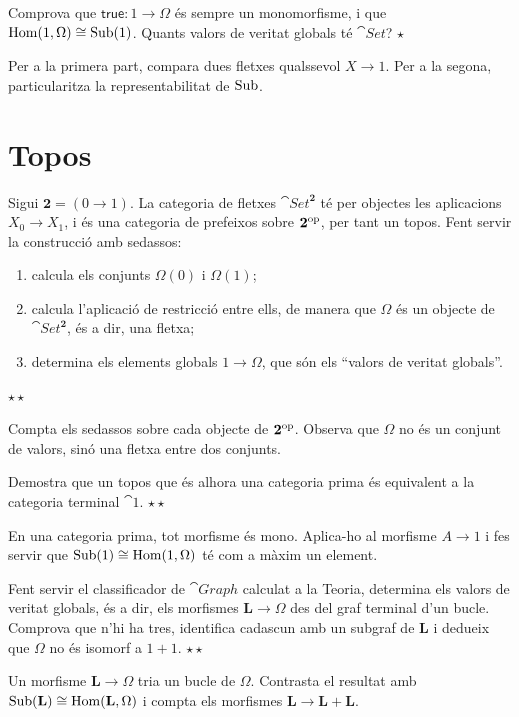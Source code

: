 \begin{exercici}
Comprova que $\mathsf{true}\colon1\to\Omega$ és sempre un monomorfisme, i que $\operatorname{Hom}(1,\Omega)\cong\operatorname{Sub}(1)$. Quants valors de veritat globals té $\cat{Set}$? \hfill{\normalfont$\star$}
\begin{indicacio}
Per a la primera part, compara dues fletxes qualssevol $X\to1$. Per a la segona, particularitza la representabilitat de $\operatorname{Sub}$.
\end{indicacio}
\end{exercici}

\section{Topos}

\begin{exercici}
Sigui $\mathbf 2=(0\to 1)$. La categoria de fletxes $\cat{Set}^{\mathbf 2}$ té per objectes les aplicacions $X_0\to X_1$, i és una categoria de prefeixos sobre $\mathbf 2^{\mathrm{op}}$, per tant un topos. Fent servir la construcció amb sedassos:
\begin{enumerate}
  \item calcula els conjunts $\Omega(0)$ i $\Omega(1)$;
  \item calcula l'aplicació de restricció entre ells, de manera que $\Omega$ és un objecte de $\cat{Set}^{\mathbf 2}$, és a dir, una fletxa;
  \item determina els elements globals $1\to\Omega$, que són els \enquote{valors de veritat globals}.
\end{enumerate}
\hfill{\normalfont$\star\star$}
\begin{indicacio}
Compta els sedassos sobre cada objecte de $\mathbf 2^{\mathrm{op}}$. Observa que $\Omega$ no és un conjunt de valors, sinó una fletxa entre dos conjunts.
\end{indicacio}
\end{exercici}

\begin{exercici}
Demostra que un topos que és alhora una categoria prima és equivalent a la categoria terminal $\cat{1}$. \hfill{\normalfont$\star\star$}
\begin{indicacio}
En una categoria prima, tot morfisme és mono. Aplica-ho al morfisme $A\to 1$ i fes servir que $\operatorname{Sub}(1)\cong\operatorname{Hom}(1,\Omega)$ té com a màxim un element.
\end{indicacio}
\end{exercici}

\begin{exercici}[Ampliació]
Fent servir el classificador de $\cat{Graph}$ calculat a la Teoria, determina els valors de veritat globals, és a dir, els morfismes $\mathbf L\to\Omega$ des del graf terminal d'un bucle. Comprova que n'hi ha tres, identifica cadascun amb un subgraf de $\mathbf L$ i dedueix que $\Omega$ no és isomorf a $1+1$. \hfill{\normalfont$\star\star$}
\begin{indicacio}
Un morfisme $\mathbf L\to\Omega$ tria un bucle de $\Omega$. Contrasta el resultat amb $\operatorname{Sub}(\mathbf L)\cong\operatorname{Hom}(\mathbf L,\Omega)$ i compta els morfismes $\mathbf L\to\mathbf L+\mathbf L$.
\end{indicacio}
\end{exercici}

